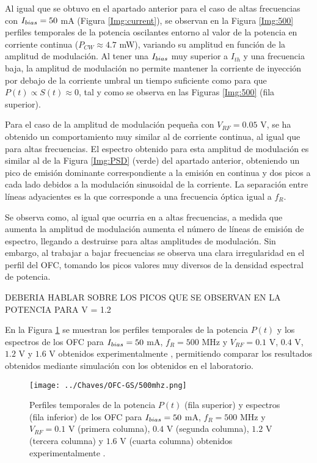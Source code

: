 		Al igual que se obtuvo en el apartado anterior para el caso de altas frecuencias con $I_{bias} = 50$ mA (Figura \ref{Img:current}), se observan en la Figura \ref{Img:500} perfiles temporales de la potencia oscilantes entorno al valor de la potencia en corriente continua ($P_{CW} \approx 4.7$ mW), variando su amplitud en funci\'on de la amplitud de modulación. Al tener una $I_{bias}$ muy superior a $I_{th}$ y una frecuencia baja, la amplitud de modulaci\'on no permite mantener la corriente de inyecci\'on por debajo de la corriente umbral un tiempo suficiente como para que $P(t) \propto S(t) \approx 0$, tal y como se observa en las Figuras \ref{Img:500} (fila superior).

		Para el caso de la amplitud de modulaci\'on pequeña con $V_{RF} = 0.05$ V, se ha obtenido un comportamiento muy similar al de corriente continua, al igual que para altas frecuencias. El espectro obtenido para esta amplitud de modulaci\'on es similar al de la Figura \ref{Img:PSD} (verde) del apartado anterior, obteniendo un pico de emisi\'on dominante correspondiente a la emisi\'on en continua y dos picos a cada lado debidos a la modulación sinusoidal de la corriente. La separación entre líneas adyacientes es la que corresponde a una frecuencia óptica igual a $f_R$.

		Se observa como, al igual que ocurria en a altas frecuencias, a medida que aumenta la amplitud de modulación aumenta el n\'umero de l\'ineas de emisión de espectro, llegando a destruirse para altas amplitudes de modulación. Sin embargo, al trabajar a bajar frecuencias se observa una clara irregularidad en el perfil del OFC, tomando los picos valores muy diversos de la densidad espectral de potencia.

		DEBERIA HABLAR SOBRE LOS PICOS QUE SE OBSERVAN EN LA POTENCIA PARA V = 1.2

		En la Figura \ref{Img:500mhz} se muestran los perfiles temporales de la potencia $P(t)$ y los espectros de los OFC para $I_{bias} = 50$ mA, $f_R = 500$ MHz y $V_{RF} = 0.1$ V, $0.4$ V, $1.2$ V y $1.6$ V obtenidos experimentalmente \cite{Chaves19}, permitiendo comparar los resultados obtenidos mediante simulación con los obtenidos en el laboratorio.

			\begin{figure}[H]
				\centering
				\texttt{[image: ../Chaves/OFC-GS/500mhz.png]}
				\caption{\label{Img:500mhz}Perfiles temporales de la potencia $P(t)$ (fila superior) y espectros (fila inferior) de los OFC para $I_{bias} = 50$ mA, $f_R = 500$ MHz y $V_{RF} = 0.1$ V (primera columna), $0.4$ V (segunda columna), $1.2$ V (tercera columna) y $1.6$ V (cuarta columna) obtenidos experimentalmente \cite{Chaves19}.}	
			\end{figure}

